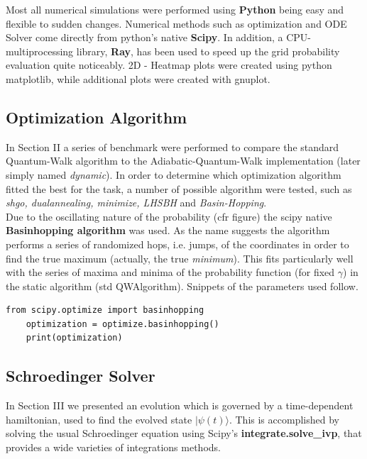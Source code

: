 \documentclass[aps,pra,reprint, onecolumn, showkeys]{revtex4-2}
\begin{document}
Most all numerical simulations were performed using \textbf{Python} being easy and flexible to sudden changes. Numerical methods such as optimization and ODE Solver come directly from python's native \textbf{Scipy}. In addition, a CPU-multiprocessing library, \textbf{Ray}, has been used to speed up the grid probability evaluation quite noticeably. 2D - Heatmap plots were created using python matplotlib, while additional plots were created with gnuplot.

\subsection{Optimization Algorithm}
In Section II a series of benchmark were performed to compare the standard Quantum-Walk algorithm to the Adiabatic-Quantum-Walk implementation (later simply named \textit{dynamic}). In order to determine which optimization algorithm fitted the best for the task, a number of possible algorithm were tested, such as \textit{shgo, dualannealing, minimize, LHSBH} and \textit{Basin-Hopping}. \\

Due to the oscillating nature of the probability (cfr figure) the scipy native \textbf{Basinhopping algorithm} was used. As the name suggests the algorithm performs a series of randomized hops, i.e. jumps, of the coordinates in order to find the true maximum (actually, the true \textit{minimum}). This fits particularly well with the series of maxima and minima of the probability function (for fixed $\gamma$) in the static algorithm (std QWAlgorithm). Snippets of the parameters used follow.

\begin{lstlisting}[xleftmargin=0cm]
	from scipy.optimize import basinhopping
	optimization = optimize.basinhopping()
	print(optimization)
\end{lstlisting}

\subsection{Schroedinger Solver}
In Section III we presented an evolution which is governed by a time-dependent hamiltonian, used to find the evolved state $|\psi(t)\rangle$. This is accomplished by solving the usual Schroedinger equation using Scipy's \textbf{integrate.solve\_ivp}, that provides a wide varieties of integrations methods. \\
\end{document}
